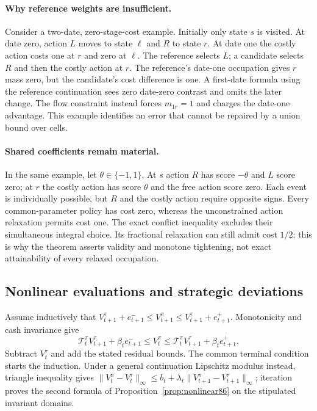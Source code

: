 \paragraph{Why reference weights are insufficient.}
Consider a two-date, zero-stage-cost example. Initially only state $s$ is visited. At date zero, action $L$ moves to state $\ell$ and $R$ to state $r$. At date one the costly action costs one at $r$ and zero at $\ell$. The reference selects $L$; a candidate selects $R$ and then the costly action at $r$. The reference's date-one occupation gives $r$ mass zero, but the candidate's cost difference is one. A first-date formula using the reference continuation sees zero date-zero contrast and omits the later change. The flow constraint instead forces $m_{1r}=1$ and charges the date-one advantage. This example identifies an error that cannot be repaired by a union bound over cells.

\paragraph{Shared coefficients remain material.}
In the same example, let $\theta\in\{-1,1\}$. At $s$ action $R$ has score $-\theta$ and $L$ score zero; at $r$ the costly action has score $\theta$ and the free action score zero. Each event is individually possible, but $R$ and the costly action require opposite signs. Every common-parameter policy has cost zero, whereas the unconstrained action relaxation permits cost one. The exact conflict inequality excludes their simultaneous integral choice. Its fractional relaxation can still admit cost $1/2$; this is why the theorem asserts validity and monotone tightening, not exact attainability of every relaxed occupation.

\subsection{Nonlinear evaluations and strategic deviations}
Assume inductively that $V_{t+1}^\tau+e_{t+1}^-\le V_{t+1}^\pi\le V_{t+1}^\tau+e_{t+1}^+$. Monotonicity and cash invariance give
\[
 \mathcal T_t^\pi V_{t+1}^\tau+\beta_te_{t+1}^-
 \le V_t^\pi\le
 \mathcal T_t^\pi V_{t+1}^\tau+\beta_te_{t+1}^+.
\]
Subtract $V_t^\tau$ and add the stated residual bounds. The common terminal condition starts the induction. Under a general continuation Lipschitz modulus instead, triangle inequality gives
$\|V_t^\pi-V_t^\tau\|_\infty\le b_t+\lambda_t\|V_{t+1}^\pi-V_{t+1}^\tau\|_\infty$; iteration proves the second formula of Proposition~\ref{prop:nonlinear86} on the stipulated invariant domains.

